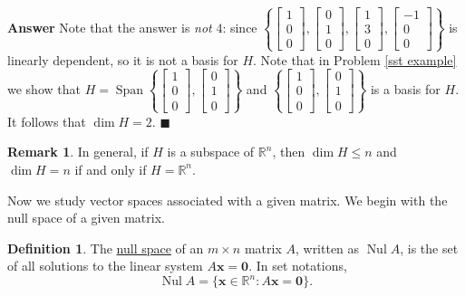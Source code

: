 \documentclass[12pt,letterpaper]{book}
\numberwithin{equation}{section}
\theoremstyle{definition}
\newtheorem{defi}[thm]{\textbf{Definition}}
\newtheorem{remark}[thm]{\textbf{Remark}}
\newenvironment{answer}{\noindent\textbf{Answer}}{\hfill$\blacksquare$\vspace{0.1in}}
\newcommand{\vx}{\bm{x}}
\newcommand{\veczero}{\bm{0}}
\newcommand{\Nul}{\operatorname{Nul}}
\newcommand{\Span}{\operatorname{Span}}
\begin{document}
\begin{answer}
Note that the answer is \textit{not} $4$: since $\left\{\left[\begin{array}{r} 1 \\ 0 \\ 0
\end{array}\right],\left[\begin{array}{r} 0 \\ 1 \\ 0
\end{array}\right],\left[\begin{array}{r} 1 \\ 3 \\ 0
\end{array}\right],\left[\begin{array}{r} -1 \\ 0 \\ 0
\end{array}\right]\right\}$ is linearly dependent, so it is not a basis for $H$. Note that in Problem \ref{sst example} we show that $H=\Span\left\{\left[\begin{array}{r} 1 \\ 0 \\ 0
\end{array}\right],\left[\begin{array}{r} 0 \\ 1 \\ 0
\end{array}\right]\right\}$ and $\left\{\left[\begin{array}{r} 1 \\ 0 \\ 0
\end{array}\right],\left[\begin{array}{r} 0 \\ 1 \\ 0
\end{array}\right]\right\}$ is a basis for $H$. It follows that $\dim H=2$.
\end{answer}

\begin{remark}\label{subdim} In general, if $H$ is a subspace of $\mathbb{R}^n$, then $\dim H \leq n$ and $\dim H=n$ if and only if $H=\mathbb{R}^n$.
\end{remark}

Now we study vector spaces associated with a given matrix. We begin with the null space of a given matrix.

\begin{defi} The \underline{null space} of an $m\times n$
matrix $A$, written as $\Nul A$, is the set of all solutions to the
linear system $A\vx=\veczero$. In set notations,
$$\Nul A=\{\vx\in \mathbb{R}^n: A\vx=\veczero\}.$$
\end{defi}
\end{document}
